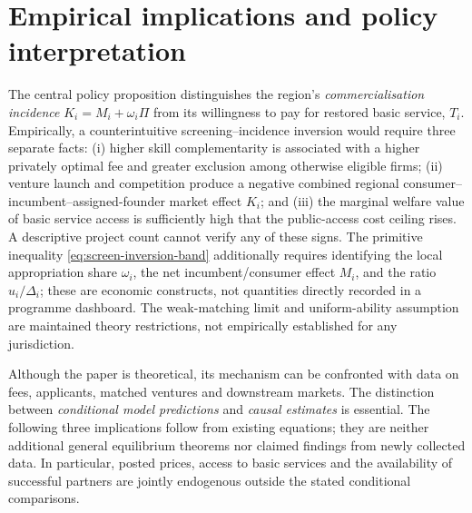 \section{Empirical implications and policy interpretation}\label{sec:empirical}

The central policy proposition distinguishes the region's \emph{commercialisation incidence} $K_i=M_i+\omega_i\Pi$ from its willingness to pay for restored basic service, $T_i$. Empirically, a counterintuitive screening--incidence inversion would require three separate facts: (i) higher skill complementarity is associated with a higher privately optimal fee and greater exclusion among otherwise eligible firms; (ii) venture launch and competition produce a negative combined regional consumer--incumbent--assigned-founder market effect $K_i$; and (iii) the marginal welfare value of basic service access is sufficiently high that the public-access cost ceiling rises. A descriptive project count cannot verify any of these signs. The primitive inequality \eqref{eq:screen-inversion-band} additionally requires identifying the local appropriation share $\omega_i$, the net incumbent/consumer effect $M_i$, and the ratio $u_i/\Delta_i$; these are economic constructs, not quantities directly recorded in a programme dashboard. The weak-matching limit and uniform-ability assumption are maintained theory restrictions, not empirically established for any jurisdiction.

Although the paper is theoretical, its mechanism can be confronted with data on fees, applicants, matched ventures and downstream markets. The distinction between \emph{conditional model predictions} and \emph{causal estimates} is essential. The following three implications follow from existing equations; they are neither additional general equilibrium theorems nor claimed findings from newly collected data. In particular, posted prices, access to basic services and the availability of successful partners are jointly endogenous outside the stated conditional comparisons.

